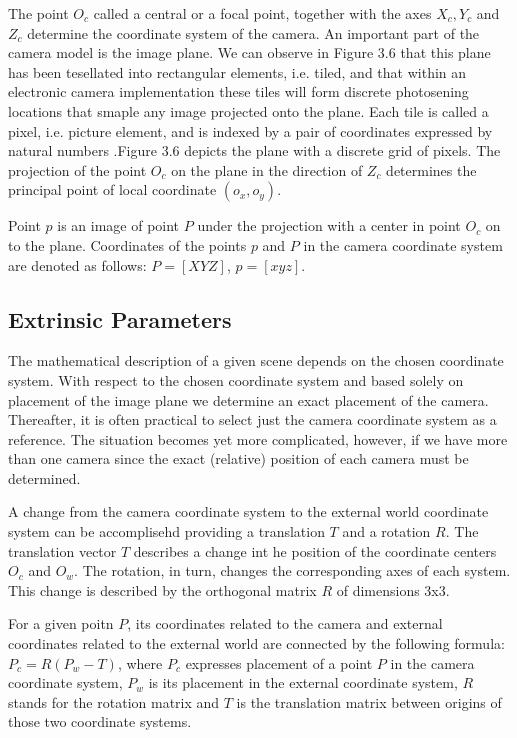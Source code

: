 \documentclass[conference]{IEEEtran}
\begin{document}
The point $O_c$ called a central or a focal point, together with the axes $X_c, Y_c$ and $Z_c$ determine the coordinate system of the camera. An important part of the camera model is the image plane. We can observe in Figure 3.6 that this plane has been tesellated into rectangular elements, i.e. tiled, and that within an electronic camera implementation these tiles will form discrete photosening locations that smaple any image projected onto the plane. Each tile is called a pixel, i.e. picture element, and is indexed by a pair of coordinates expressed by natural numbers .Figure 3.6 depicts the plane with a discrete grid of pixels. The projection of the point $O_c$ on the plane in the direction of $Z_c$ determines the principal point of local coordinate $(o_x, o_y)$. 

Point $p$ is an image of point $P$ under the projection with a center in point $O_c$ on to the plane. Coordinates of the points $p$ and $P$ in the camera coordinate system are denoted as follows: $P = [X Y Z]$, $p = [x y z]$. 

\subsection*{Extrinsic Parameters}
The mathematical description of a given scene depends on the chosen coordinate system. With respect to the chosen coordinate system and based solely on placement of the image plane we determine an exact placement of the camera. Thereafter, it is often practical to select just the camera coordinate system as a reference. The situation becomes yet more complicated, however, if we have more than one camera since the exact (relative) position of each camera must be determined.

A change from the camera coordinate system to the external world coordinate system can be accomplisehd providing a translation $T$ and a rotation $R$. The translation vector $T$ describes a change int he position of the coordinate centers $O_c$ and $O_w$. The rotation, in turn, changes the corresponding axes of each system. This change is described by the orthogonal matrix $R$ of dimensions 3x3.

For a given poitn $P$, its coordinates related to the camera and external coordinates related to the external world are connected by the following formula: $P_c = R(P_w - T)$, where $P_c$ expresses placement of a point $P$ in the camera coordinate system, $P_w$ is its placement in the external coordinate system, $R$ stands for the rotation matrix and $T$ is the translation matrix between origins of those two coordinate systems. 
\end{document}
